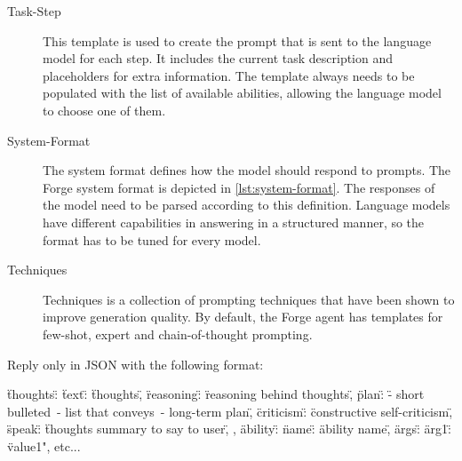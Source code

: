 \documentclass[../main.tex]{subfiles}
\begin{document}
\begin{description}
    \item[Task-Step] This template is used to create the prompt that is sent to the language model for each step.
        It includes the current task description and placeholders for extra information.
        The template always needs to be populated with the list of available abilities,
        allowing the language model to choose one of them.
    \item[System-Format] The system format defines how the model should respond to prompts.
        The Forge system format is depicted in \autoref{lst:system-format}.
        The responses of the model need to be parsed according to this definition.
        Language models have different capabilities in answering in a structured manner, %
        so the format has to be tuned for every model.
    \item[Techniques] Techniques is a collection of prompting techniques that have been shown to improve generation quality.
        By default, the Forge agent has templates for few-shot, expert and chain-of-thought prompting. %
\end{description}

\begin{Code}[
      caption={The system format of the Forge agent.
                  The language model is asked to only answer in this format.
                  The thoughts before creating the output for the user (speak),
                  the LLM generates reasoning, a plan and criticism.
                  After the model generated its thoughts,
                  it generates an ability proposal with the corresponding arguments.},
      label={lst:system-format},
      captionpos=b,
      float=tp]
      Reply only in JSON with the following format:

      {
            \"thoughts\": {
                  \"text\":  \"thoughts\",
                  \"reasoning\": \"reasoning behind thoughts\",
                  \"plan\": \"- short bulleted\
                              - list that conveys\
                              - long-term plan\",
                  \"criticism\": \"constructive self-criticism\",
                  \"speak\": \"thoughts summary to say to user\",
            },
            \"ability\": {
                  \"name\": \"ability name\",
                  \"args\": {
                        \"arg1\": \"value1", etc...
                  }
            }
      }
\end{Code}
\end{document}
